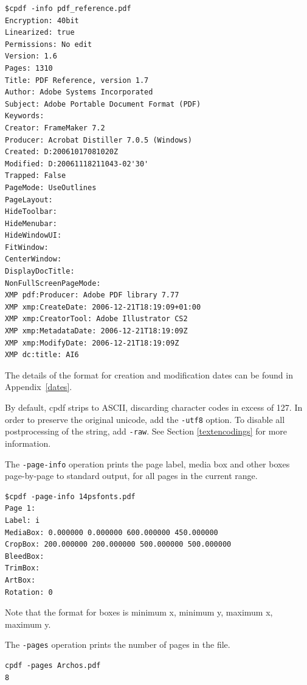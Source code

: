 \documentclass{book}
\newcommand{\smallgap}{\bigskip}
\begin{document}
\begin{framed}
{\small\begin{verbatim}
$cpdf -info pdf_reference.pdf
Encryption: 40bit
Linearized: true
Permissions: No edit
Version: 1.6
Pages: 1310
Title: PDF Reference, version 1.7
Author: Adobe Systems Incorporated
Subject: Adobe Portable Document Format (PDF)
Keywords: 
Creator: FrameMaker 7.2
Producer: Acrobat Distiller 7.0.5 (Windows)
Created: D:20061017081020Z
Modified: D:20061118211043-02'30'
Trapped: False
PageMode: UseOutlines
PageLayout: 
HideToolbar: 
HideMenubar: 
HideWindowUI: 
FitWindow: 
CenterWindow: 
DisplayDocTitle: 
NonFullScreenPageMode: 
XMP pdf:Producer: Adobe PDF library 7.77
XMP xmp:CreateDate: 2006-12-21T18:19:09+01:00
XMP xmp:CreatorTool: Adobe Illustrator CS2
XMP xmp:MetadataDate: 2006-12-21T18:19:09Z
XMP xmp:ModifyDate: 2006-12-21T18:19:09Z
XMP dc:title: AI6\end{verbatim}}\end{framed}
\noindent The details of the format for creation and modification dates can be found in
Appendix~\ref{dates}.

By default, cpdf strips to ASCII, discarding character codes in excess of 127. In order to preserve the original unicode, add the \texttt{-utf8} option. To disable all postprocessing of the string, add \texttt{-raw}. See Section \ref{textencodings} for more information.

\vspace{4mm}
The \texttt{-page-info} operation prints the page label, media box and other boxes
page-by-page to standard output, for all pages in the current range.

\begin{framed}
{\small\begin{verbatim}
$cpdf -page-info 14psfonts.pdf
Page 1:
Label: i
MediaBox: 0.000000 0.000000 600.000000 450.000000
CropBox: 200.000000 200.000000 500.000000 500.000000
BleedBox: 
TrimBox: 
ArtBox:
Rotation: 0
\end{verbatim}}
\end{framed}

\noindent Note that the format for boxes is minimum x, minimum y, maximum x, maximum y.

\smallgap 
\noindent The \texttt{-pages} operation prints the number of pages in the file.
\begin{framed}
{\small\begin{verbatim}
cpdf -pages Archos.pdf
8
\end{verbatim}}
\end{framed}
\end{document}
